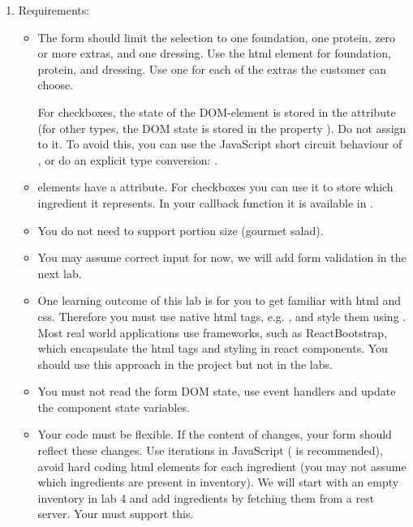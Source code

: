 \documentclass[fleqn, article, a4paper]{memoir}
\begin{document}
\begin{Assignments}
\begin{enumerate}
\item Requirements:
\begin{itemize}
  \item The form should limit the selection to one foundation, one protein, zero or more extras, and one dressing. Use the html element  for foundation, protein, and dressing. Use one  for each of the extras the customer can choose.

For checkboxes, the state of the DOM-element is stored in the attribute  (for other  types, the DOM state is stored in the property ). Do not assign  to it. To avoid this, you can use the JavaScript short circuit behaviour of \code{||} , or do an explicit type conversion: .
  \item {} elements have a  attribute. For checkboxes you can use it to store which ingredient it represents. In your callback function it is available in .

  \item You do not need to support portion size (gourmet salad).

  \item You may assume correct input for now, we will add form validation in the next lab.

  \item One learning outcome of this lab is for you to get familiar with html and css. Therefore you must use native html tags, e.g. , and style them using . Most real world applications use frameworks, such as ReactBootstrap, which encapsulate the html tags and styling in react components. You should use this approach in the project but not in the labs.
  \item You must not read the form DOM state, use event handlers and update the component state variables.
  \item Your code must be flexible. If the content of  changes, your form should reflect these changes. Use iterations in JavaScript ( is recommended), avoid hard coding html elements for each ingredient (you may not assume which ingredients are present in inventory). We will start with an empty inventory in lab 4 and add ingredients by fetching them from a rest server. Your  must support this.


\end{itemize}
\end{enumerate}
\end{Assignments}
\end{document}
